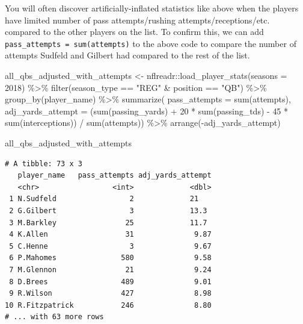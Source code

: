 \documentclass[
  letterpaper,
]{krantz}
\newenvironment{Shaded}{\begin{snugshade}}{\end{snugshade}}
\newcommand{\AttributeTok}[1]{\textcolor[rgb]{0.40,0.45,0.13}{#1}}
\newcommand{\DecValTok}[1]{\textcolor[rgb]{0.68,0.00,0.00}{#1}}
\newcommand{\FunctionTok}[1]{\textcolor[rgb]{0.28,0.35,0.67}{#1}}
\newcommand{\NormalTok}[1]{\textcolor[rgb]{0.00,0.23,0.31}{#1}}
\newcommand{\OtherTok}[1]{\textcolor[rgb]{0.00,0.23,0.31}{#1}}
\newcommand{\SpecialCharTok}[1]{\textcolor[rgb]{0.37,0.37,0.37}{#1}}
\newcommand{\StringTok}[1]{\textcolor[rgb]{0.13,0.47,0.30}{#1}}
\begin{document}
\begin{tcolorbox}[enhanced jigsaw, left=2mm, toprule=.15mm, opacitybacktitle=0.6, leftrule=.75mm, bottomrule=.15mm, colbacktitle=quarto-callout-important-color!10!white, breakable, colback=white, bottomtitle=1mm, toptitle=1mm, title=\textcolor{quarto-callout-important-color}{\faExclamation}\hspace{0.5em}{Important}, coltitle=black, titlerule=0mm, arc=.35mm, opacityback=0, colframe=quarto-callout-important-color-frame, rightrule=.15mm]

You will often discover artificially-inflated statistics like above when
the players have limited number of pass attempts/rushing
attempts/receptions/etc. compared to the other players on the list. To
confirm this, we can add \texttt{pass\_attempts\ =\ sum(attempts)} to
the above code to compare the number of attempts Sudfeld and Gilbert had
compared to the rest of the list.

\begin{Shaded}
\begin{Highlighting}[]
\NormalTok{all\_qbs\_adjusted\_with\_attempts }\OtherTok{\textless{}{-}}
\NormalTok{  nflreadr}\SpecialCharTok{::}\FunctionTok{load\_player\_stats}\NormalTok{(}\AttributeTok{seasons =} \DecValTok{2018}\NormalTok{) }\SpecialCharTok{\%\textgreater{}\%}
  \FunctionTok{filter}\NormalTok{(season\_type }\SpecialCharTok{==} \StringTok{"REG"} \SpecialCharTok{\&}\NormalTok{ position }\SpecialCharTok{==} \StringTok{"QB"}\NormalTok{) }\SpecialCharTok{\%\textgreater{}\%}
  \FunctionTok{group\_by}\NormalTok{(player\_name) }\SpecialCharTok{\%\textgreater{}\%}
  \FunctionTok{summarize}\NormalTok{(}
    \AttributeTok{pass\_attempts =} \FunctionTok{sum}\NormalTok{(attempts),}
    \AttributeTok{adj\_yards\_attempt =}\NormalTok{ (}\FunctionTok{sum}\NormalTok{(passing\_yards) }\SpecialCharTok{+} \DecValTok{20} \SpecialCharTok{*}
                           \FunctionTok{sum}\NormalTok{(passing\_tds) }\SpecialCharTok{{-}} \DecValTok{45} \SpecialCharTok{*}
                           \FunctionTok{sum}\NormalTok{(interceptions)) }\SpecialCharTok{/} \FunctionTok{sum}\NormalTok{(attempts)) }\SpecialCharTok{\%\textgreater{}\%}
  \FunctionTok{arrange}\NormalTok{(}\SpecialCharTok{{-}}\NormalTok{adj\_yards\_attempt)}

\NormalTok{all\_qbs\_adjusted\_with\_attempts}
\end{Highlighting}
\end{Shaded}

\begin{verbatim}
# A tibble: 73 x 3
   player_name   pass_attempts adj_yards_attempt
   <chr>                 <int>             <dbl>
 1 N.Sudfeld                 2             21   
 2 G.Gilbert                 3             13.3 
 3 M.Barkley                25             11.7 
 4 K.Allen                  31              9.87
 5 C.Henne                   3              9.67
 6 P.Mahomes               580              9.58
 7 M.Glennon                21              9.24
 8 D.Brees                 489              9.01
 9 R.Wilson                427              8.98
10 R.Fitzpatrick           246              8.80
# ... with 63 more rows
\end{verbatim}


\end{tcolorbox}
\end{document}
